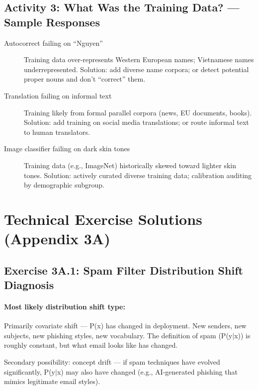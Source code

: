 \subsection{Activity 3: What Was the Training Data? --- Sample Responses}

\begin{description}
    \item[Autocorrect failing on ``Nguyen''] Training data over-represents Western European names; Vietnamese names underrepresented. Solution: add diverse name corpora; or detect potential proper nouns and don't ``correct'' them.
    \item[Translation failing on informal text] Training likely from formal parallel corpora (news, EU documents, books). Solution: add training on social media translations; or route informal text to human translators.
    \item[Image classifier failing on dark skin tones] Training data (e.g., ImageNet) historically skewed toward lighter skin tones. Solution: actively curated diverse training data; calibration auditing by demographic subgroup.
\end{description}

\section{Technical Exercise Solutions (Appendix 3A)}

\subsection{Exercise 3A.1: Spam Filter Distribution Shift Diagnosis}

\paragraph{Most likely distribution shift type:} Primarily covariate shift --- P(x) has changed in deployment. New senders, new subjects, new phishing styles, new vocabulary. The definition of spam (P(y$\mid$x)) is roughly constant, but what email looks like has changed.

Secondary possibility: concept drift --- if spam techniques have evolved significantly, P(y$\mid$x) may also have changed (e.g., AI-generated phishing that mimics legitimate email styles).

